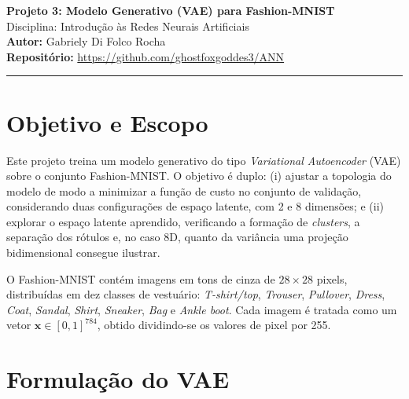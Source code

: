 \documentclass[11pt,a4paper]{article}
\begin{document}
\begin{center}
{\LARGE \textbf{Projeto 3: Modelo Generativo (VAE) para Fashion-MNIST}} \\[0.35em]
{\large Disciplina: Introdução às Redes Neurais Artificiais} \\[0.3em]
\textbf{Autor:} Gabriely Di Folco Rocha \\[0.2em]
\textbf{Repositório:} \url{https://github.com/ghostfoxgoddes3/ANN}
\end{center}

\vspace{-0.5em}
\hrule
\vspace{0.8em}

\section{Objetivo e Escopo}

Este projeto treina um modelo generativo do tipo \textit{Variational
Autoencoder} (VAE) sobre o conjunto Fashion-MNIST. O objetivo é duplo: (i)
ajustar a topologia do modelo de modo a minimizar a função de custo no conjunto
de validação, considerando duas configurações de espaço latente, com 2 e 8
dimensões; e (ii) explorar o espaço latente aprendido, verificando a formação
de \textit{clusters}, a separação dos rótulos e, no caso 8D, quanto da variância
uma projeção bidimensional consegue ilustrar.

O Fashion-MNIST contém imagens em tons de cinza de $28\times28$ pixels,
distribuídas em dez classes de vestuário: \textit{T-shirt/top}, \textit{Trouser},
\textit{Pullover}, \textit{Dress}, \textit{Coat}, \textit{Sandal},
\textit{Shirt}, \textit{Sneaker}, \textit{Bag} e \textit{Ankle boot}. Cada
imagem é tratada como um vetor $\mathbf{x}\in[0,1]^{784}$, obtido dividindo-se
os valores de pixel por 255.

\section{Formulação do VAE}
\end{document}

